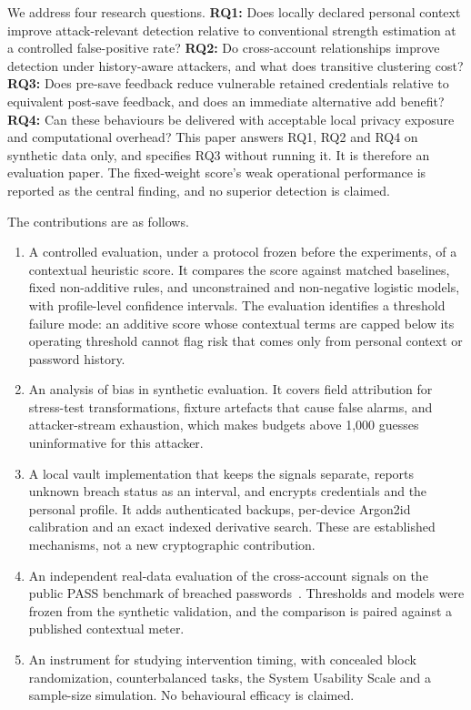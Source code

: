 \documentclass[preprint,12pt]{elsarticle}
\begin{document}
We address four research questions. \textbf{RQ1:} Does locally declared personal context improve attack-relevant detection relative to conventional strength estimation at a controlled false-positive rate? \textbf{RQ2:} Do cross-account relationships improve detection under history-aware attackers, and what does transitive clustering cost? \textbf{RQ3:} Does pre-save feedback reduce vulnerable retained credentials relative to equivalent post-save feedback, and does an immediate alternative add benefit? \textbf{RQ4:} Can these behaviours be delivered with acceptable local privacy exposure and computational overhead? This paper answers RQ1, RQ2 and RQ4 on synthetic data only, and specifies RQ3 without running it. It is therefore an evaluation paper. The fixed-weight score's weak operational performance is reported as the central finding, and no superior detection is claimed.

The contributions are as follows.
\begin{enumerate}
\item A controlled evaluation, under a protocol frozen before the experiments, of a contextual heuristic score. It compares the score against matched baselines, fixed non-additive rules, and unconstrained and non-negative logistic models, with profile-level confidence intervals. The evaluation identifies a threshold failure mode: an additive score whose contextual terms are capped below its operating threshold cannot flag risk that comes only from personal context or password history.
\item An analysis of bias in synthetic evaluation. It covers field attribution for stress-test transformations, fixture artefacts that cause false alarms, and attacker-stream exhaustion, which makes budgets above 1,000 guesses uninformative for this attacker.
\item A local vault implementation that keeps the signals separate, reports unknown breach status as an interval, and encrypts credentials and the personal profile. It adds authenticated backups, per-device Argon2id calibration and an exact indexed derivative search. These are established mechanisms, not a new cryptographic contribution.
\item An independent real-data evaluation of the cross-account signals on the public PASS benchmark of breached passwords~\cite{pass}. Thresholds and models were frozen from the synthetic validation, and the comparison is paired against a published contextual meter.
\item An instrument for studying intervention timing, with concealed block randomization, counterbalanced tasks, the System Usability Scale and a sample-size simulation. No behavioural efficacy is claimed.
\end{enumerate}
\end{document}
